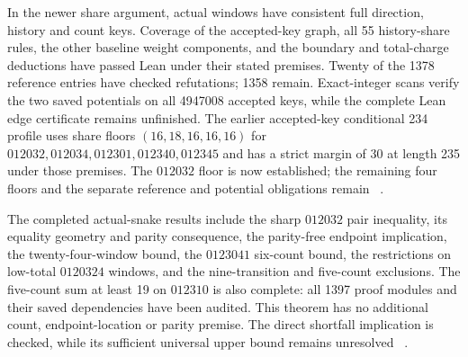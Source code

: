 \documentclass[11pt,a4paper]{article}
\theoremstyle{definition}
\theoremstyle{remark}
\begin{document}
In the newer share argument, actual windows have consistent full direction,
history and count keys. Coverage of the accepted-key graph, all 55
history-share rules, the other baseline weight components, and the boundary
and total-charge deductions have passed Lean under their stated premises.
Twenty of the 1378 reference entries have checked refutations; 1358 remain.
Exact-integer scans verify the two saved potentials on all 4947008 accepted
keys, while the complete Lean edge certificate remains unfinished.
The earlier accepted-key conditional 234 profile uses share floors
$(16,18,16,16,16)$ for $012032,012034,012301,012340,012345$ and has a
strict margin of 30 at length 235 under those premises. The $012032$
floor is now established; the remaining four floors and the separate
reference and potential obligations remain
~\cite{referenceunionarchive,potentialcertificatearchive,share152archive}.

The completed actual-snake results include the sharp $012032$ pair
inequality, its equality geometry and parity consequence, the parity-free
endpoint implication, the twenty-four-window bound, the $0123041$
six-count bound, the restrictions on low-total $0120324$ windows, and the
nine-transition and five-count exclusions. The five-count sum at least 19
on $012310$ is also complete: all 1397 proof modules and their saved
dependencies have been audited. This theorem has no additional count,
endpoint-location or parity premise. The direct shortfall implication is
checked, while its sufficient universal upper bound remains unresolved
~\cite{count24archive,fivecount140archive,share145archive}.
\end{document}

